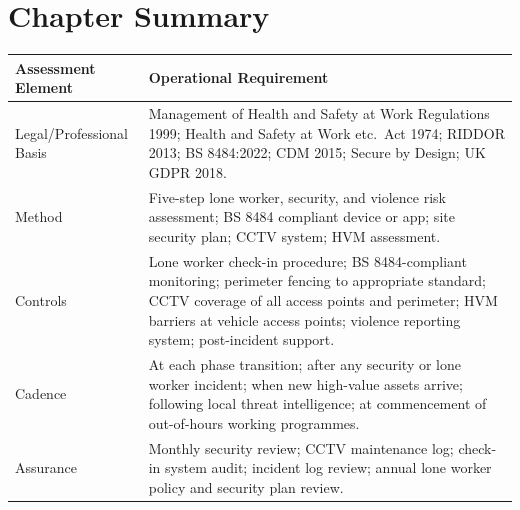 
\newpage
\section{Chapter Summary}

\begin{table}[H]
\centering
\begin{tabularx}{\textwidth}{>{\raggedright\arraybackslash}p{3.2cm}X}
\toprule
\textbf{Assessment Element} & \textbf{Operational Requirement} \\
\midrule
Legal/Professional Basis & Management of Health and Safety at Work Regulations 1999; Health and Safety at Work etc.\ Act 1974; RIDDOR 2013; BS 8484:2022; CDM 2015; Secure by Design; UK GDPR 2018. \\
Method & Five-step lone worker, security, and violence risk assessment; BS 8484 compliant device or app; site security plan; CCTV system; HVM assessment. \\
Controls & Lone worker check-in procedure; BS 8484-compliant monitoring; perimeter fencing to appropriate standard; CCTV coverage of all access points and perimeter; HVM barriers at vehicle access points; violence reporting system; post-incident support. \\
Cadence & At each phase transition; after any security or lone worker incident; when new high-value assets arrive; following local threat intelligence; at commencement of out-of-hours working programmes. \\
Assurance & Monthly security review; CCTV maintenance log; check-in system audit; incident log review; annual lone worker policy and security plan review. \\
\bottomrule
\end{tabularx}
\end{table}

